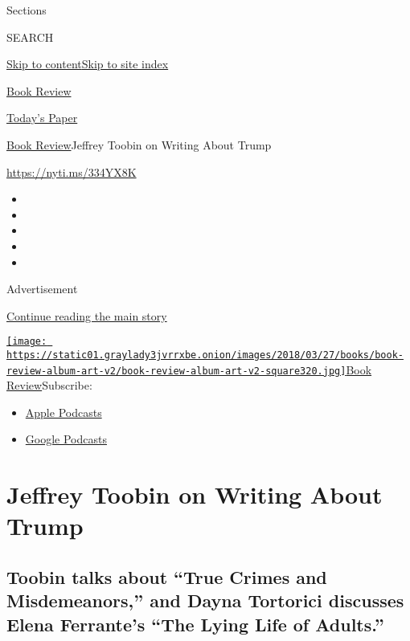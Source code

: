 Sections

SEARCH

\protect\hyperlink{site-content}{Skip to
content}\protect\hyperlink{site-index}{Skip to site index}

\href{https://www.nytimes3xbfgragh.onion/section/books/review}{Book
Review}

\href{https://myaccount.nytimes3xbfgragh.onion/auth/login?response_type=cookie\&client_id=vi}{}

\href{https://www.nytimes3xbfgragh.onion/section/todayspaper}{Today's
Paper}

\href{/section/books/review}{Book Review}\textbar{}Jeffrey Toobin on
Writing About Trump

\url{https://nyti.ms/334YX8K}

\begin{itemize}
\item
\item
\item
\item
\item
\end{itemize}

Advertisement

\protect\hyperlink{after-top}{Continue reading the main story}

\href{https://www.nytimes3xbfgragh.onion/column/book-review-podcast}{\texttt{[image: https://static01.graylady3jvrrxbe.onion/images/2018/03/27/books/book-review-album-art-v2/book-review-album-art-v2-square320.jpg]}Book
Review}Subscribe:

\begin{itemize}
\tightlist
\item
  \href{https://itunes.apple.com/us/podcast/id120315179}{Apple Podcasts}
\item
  \href{https://www.google.com/podcasts?feed=aHR0cHM6Ly9yc3MuYXJ0MTkuY29tL2Jvb2stcmV2aWV3}{Google
  Podcasts}
\end{itemize}

\hypertarget{jeffrey-toobin-on-writing-about-trump}{%
\section{Jeffrey Toobin on Writing About
Trump}\label{jeffrey-toobin-on-writing-about-trump}}

\hypertarget{toobin-talks-about-true-crimes-and-misdemeanors-and-dayna-tortorici-discusses-elena-ferrantes-the-lying-life-of-adults}{%
\subsection{Toobin talks about ``True Crimes and Misdemeanors,'' and
Dayna Tortorici discusses Elena Ferrante's ``The Lying Life of
Adults.''}\label{toobin-talks-about-true-crimes-and-misdemeanors-and-dayna-tortorici-discusses-elena-ferrantes-the-lying-life-of-adults}}

